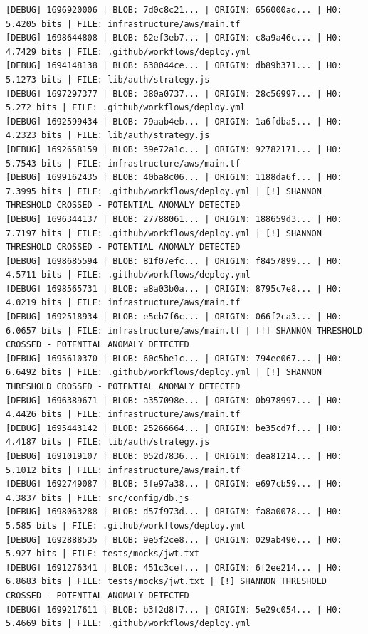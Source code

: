 \documentclass[12pt, a4paper, oneside]{report}
\begin{document}
\begin{lstlisting}[basicstyle=\tiny\ttfamily]
[DEBUG] 1696920006 | BLOB: 7d0c8c21... | ORIGIN: 656000ad... | H0: 5.4205 bits | FILE: infrastructure/aws/main.tf
[DEBUG] 1698644808 | BLOB: 62ef3eb7... | ORIGIN: c8a9a46c... | H0: 4.7429 bits | FILE: .github/workflows/deploy.yml
[DEBUG] 1694148138 | BLOB: 630044ce... | ORIGIN: db89b371... | H0: 5.1273 bits | FILE: lib/auth/strategy.js
[DEBUG] 1697297377 | BLOB: 380a0737... | ORIGIN: 28c56997... | H0: 5.272 bits | FILE: .github/workflows/deploy.yml
[DEBUG] 1692599434 | BLOB: 79aab4eb... | ORIGIN: 1a6fdba5... | H0: 4.2323 bits | FILE: lib/auth/strategy.js
[DEBUG] 1692658159 | BLOB: 39e72a1c... | ORIGIN: 92782171... | H0: 5.7543 bits | FILE: infrastructure/aws/main.tf
[DEBUG] 1699162435 | BLOB: 40ba8c06... | ORIGIN: 1188da6f... | H0: 7.3995 bits | FILE: .github/workflows/deploy.yml | [!] SHANNON THRESHOLD CROSSED - POTENTIAL ANOMALY DETECTED
[DEBUG] 1696344137 | BLOB: 27788061... | ORIGIN: 188659d3... | H0: 7.7197 bits | FILE: .github/workflows/deploy.yml | [!] SHANNON THRESHOLD CROSSED - POTENTIAL ANOMALY DETECTED
[DEBUG] 1698685594 | BLOB: 81f07efc... | ORIGIN: f8457899... | H0: 4.5711 bits | FILE: .github/workflows/deploy.yml
[DEBUG] 1698565731 | BLOB: a8a03b0a... | ORIGIN: 8795c7e8... | H0: 4.0219 bits | FILE: infrastructure/aws/main.tf
[DEBUG] 1692518934 | BLOB: e5cb7f6c... | ORIGIN: 066f2ca3... | H0: 6.0657 bits | FILE: infrastructure/aws/main.tf | [!] SHANNON THRESHOLD CROSSED - POTENTIAL ANOMALY DETECTED
[DEBUG] 1695610370 | BLOB: 60c5be1c... | ORIGIN: 794ee067... | H0: 6.6492 bits | FILE: .github/workflows/deploy.yml | [!] SHANNON THRESHOLD CROSSED - POTENTIAL ANOMALY DETECTED
[DEBUG] 1696389671 | BLOB: a357098e... | ORIGIN: 0b978997... | H0: 4.4426 bits | FILE: infrastructure/aws/main.tf
[DEBUG] 1695443142 | BLOB: 25266664... | ORIGIN: be35cd7f... | H0: 4.4187 bits | FILE: lib/auth/strategy.js
[DEBUG] 1691019107 | BLOB: 052d7836... | ORIGIN: dea81214... | H0: 5.1012 bits | FILE: infrastructure/aws/main.tf
[DEBUG] 1692749087 | BLOB: 3fe97a38... | ORIGIN: e697cb59... | H0: 4.3837 bits | FILE: src/config/db.js
[DEBUG] 1698063288 | BLOB: d57f973d... | ORIGIN: fa8a0078... | H0: 5.585 bits | FILE: .github/workflows/deploy.yml
[DEBUG] 1692888535 | BLOB: 9e5f2ce8... | ORIGIN: 029ab490... | H0: 5.927 bits | FILE: tests/mocks/jwt.txt
[DEBUG] 1691276341 | BLOB: 451c3cef... | ORIGIN: 6f2ee214... | H0: 6.8683 bits | FILE: tests/mocks/jwt.txt | [!] SHANNON THRESHOLD CROSSED - POTENTIAL ANOMALY DETECTED
[DEBUG] 1699217611 | BLOB: b3f2d8f7... | ORIGIN: 5e29c054... | H0: 5.4669 bits | FILE: .github/workflows/deploy.yml

\end{lstlisting}
\end{document}
